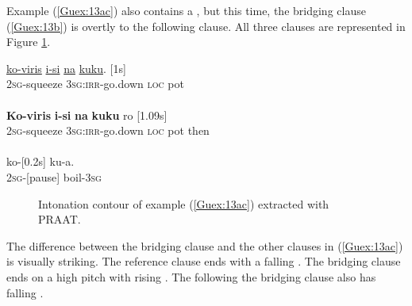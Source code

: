 \documentclass[output=paper]{LSP/langsci}
\begin{document}
Example (\ref{Guex:13ac}) also contains a , but this time, the bridging clause (\ref{Guex:13b}) is overtly  to the following clause. All three clauses are represented in Figure \ref{GuF3}. 

\begin{exe}
\ex \label{Guex:13ac}
\begin{xlist}
\ex \label{Guex:13a}
\gll \underline{ko-viris}          \underline{i-si}                 \underline{na}     \underline{kuku}. [1s]\\
\textsc{2sg}-squeeze     \textsc{3sg:irr-}go.down   \textsc{loc}    pot \\
\glt {}\\
\ex \label{Guex:13b}
\gll \textbf{Ko-viris}          \textbf{i-si}               \textbf{na}    \textbf{kuku}   ro [1.09s] \\
\textsc{2sg}-squeeze     \textsc{3sg:irr-}go.down   \textsc{loc}    pot then\\
\glt {}\\
\ex \label{Guex:13c}
\gll   ko-[0.2s] ku-a.\\     	       
\textsc{2sg}-[pause] boil-\textsc{3sg}\\
\glt {} 
\end{xlist}
\end{exe}

\begin{figure}[ht]
\caption{Intonation contour of example (\ref{Guex:13ac}) extracted with PRAAT. \label{GuF3}}
\end{figure}

The difference between the bridging clause and the other clauses in (\ref{Guex:13ac}) is visually striking. The reference clause ends with a falling . The bridging clause ends on a high pitch with rising . The  following the bridging clause also has falling . 
\end{document}
